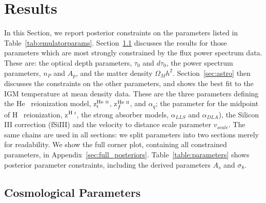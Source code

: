 \section{Results}\label{sec:results}

In this Section, we report posterior constraints on the parameters listed in Table~\ref{tab:emulatorparams}.
Section~\ref{sec:cosmo} discusses the results for those parameters which are most strongly constrained by the flux power spectrum data.
These are: the optical depth parameters, $\tau_0$ and $d\tau_0$, the power spectrum parameters, $n_P$ and $A_p$, and the matter density $\Omega_M h^2$.
Section~\ref{sec:astro} then discusses the constraints on the other parameters, and shows the best fit to the IGM temperature at mean density data.
These are the three parameters defining the He~{} reionization model, z$^{\text{He~{\sc ii}}}_i$, z$^{\text{He~{\sc ii}}}_f$, and $\alpha_q$; the parameter for the midpoint of H~{} reionization, z$^{\text{H~{\sc i}}}$, the strong absorber models, $\alpha_{LLS}$ and $\alpha_{DLA}$), the Silicon III correction (fSiIII) and the velocity to distance scale parameter $v_{scale}$.
The same chains are used in all sections: we split parameters into two sections merely for readability.
We show the full corner plot, containing all constrained parameters, in Appendix~\ref{sec:full_posteriors}.
Table~\ref{table:parameters} shows posterior parameter constraints, including the derived parameters $A_s$ and $\sigma_8$. 


\subsection{Cosmological Parameters}\label{sec:cosmo}

